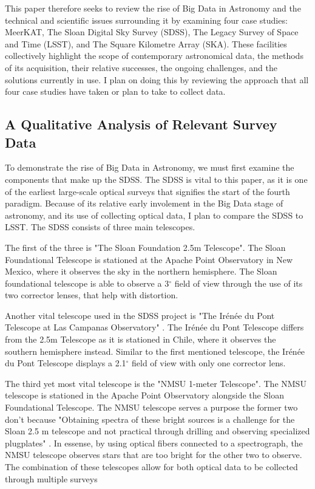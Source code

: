 \documentclass[preprint,linenumbers, longauthor]{aastex631}
\begin{document}
This paper therefore seeks to review the rise of Big Data in Astronomy and the technical and scientific issues surrounding it by examining four case studies: MeerKAT, The Sloan Digital Sky Survey (SDSS), The Legacy Survey of Space and Time (LSST), and The Square Kilometre Array (SKA). 
These facilities collectively highlight the scope of contemporary astronomical data, the methods of its acquisition, their relative successes, the ongoing challenges, and the solutions currently in use. I plan on doing this by reviewing the approach that all four case studies have taken or plan to take to collect data.

\subsection{A Qualitative Analysis of Relevant Survey Data}
To demonstrate the rise of Big Data in Astronomy, we must first examine the components that make up the SDSS. The SDSS is vital to this paper, as it is one of the earliest large-scale optical surveys that signifies the start of the fourth paradigm. 
Because of its relative early involement in the Big Data stage of astronomy, and its use of collecting optical data, I plan to compare the SDSS to LSST. The SDSS
consists of three main telescopes.

The first of the three is "The Sloan Foundation 2.5m Telescope". 
The Sloan Foundational Telescope is stationed at the Apache Point Observatory in New Mexico, where it observes the sky in the northern hemisphere. 
The Sloan foundational telescope is able to observe a 3$^\circ$ field of view through the use of its two corrector lenses, that help with distortion. \cite{gunn25TelescopeSloan2006}

Another vital telescope used in the SDSS project is "The Irénée du Pont Telescope at Las Campanas Observatory" . The Irénée du Pont Telescope differs from the 2.5m Telescope as it is stationed in Chile, where it observes the southern hemisphere instead. 
Similar to the first mentioned telescope, the Irénée du Pont Telescope displays a 2.1$^\circ$ field of view with only one corrector lens. \cite{bowenOpticalDesign40in1973}

The third yet most vital telescope is the "NMSU 1-meter Telescope". The NMSU telescope is stationed in the Apache Point Observatory alongside the Sloan Foundational Telescope. 
The NMSU telescope serves a purpose the former two don't because "Obtaining spectra of these bright sources is a challenge for the Sloan 2.5 m telescope and not practical through drilling and observing specialized plugplates" \cite{majewskiApachePointObservatory2017}. 
In essense, by using optical fibers connected to a spectrograph, the NMSU telescope observes stars that are too bright for the other two to observe. 
The combination of these telescopes allow for both optical data to be collected through multiple surveys \cite{holtzmanNMSU1Telescope2010}
\end{document}
